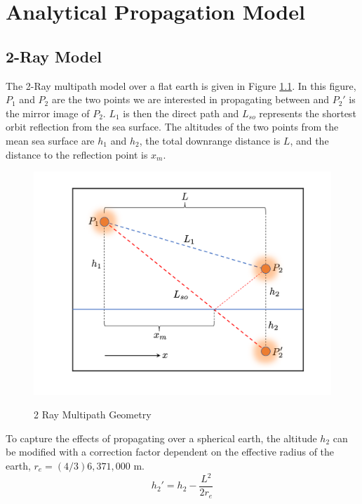 \chapter{Analytical Propagation Model}
\label{analytical_propagation}

\section{2-Ray Model}
The 2-Ray multipath model over a flat earth is given in Figure \ref{mp_fig:1}. In this figure, $P_1$ and $P_2$ are the two points we are interested in propagating between and $P_2'$ is the mirror image of $P_2$. $L_1$ is then the direct path and $L_{so}$ represents the shortest orbit reflection from the sea surface. The altitudes of the two points from the mean sea surface are $h_1$ and $h_2$, the total downrange distance is $L$, and the distance to the reflection point is $x_m$.

\begin{figure}[H]
  \begin{center}
\includegraphics[width=5in]{../media/analysis/multipath_2_ray.png}
  \end{center}
  \renewcommand{\baselinestretch}{1} \small\normalsize
  \begin{quote}
    \caption[2 Ray Multipath Geometry]{ 2 Ray Multipath Geometry\label{mp_fig:1}}
  \end{quote}
\end{figure}
\renewcommand{\baselinestretch}{2} \small\normalsize

To capture the effects of propagating over a spherical earth, the altitude $h_2$ can be modified with a correction factor \cite{blake_radar} dependent on the effective radius of the earth, $r_e = (4/3) 6,371,000$ m.
\begin{equation}
h_2' = h_2 - \frac{L^2}{2r_e}
\label{mp_eq:0}
\end{equation}

